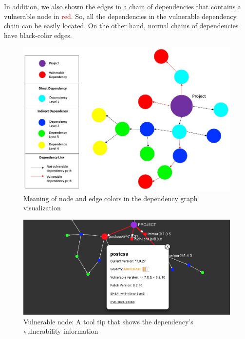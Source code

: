 \documentclass[conference]{IEEEtran}
\begin{document}
	In addition, we also shown the edges in a chain of dependencies that contains a vulnerable node in \textcolor{red}{red}. So, all the dependencies in the vulnerable dependency chain can be easily located. On the other hand, normal chains of dependencies have black-color edges.
	
	\begin{figure}[tb]
		\centering
		\includegraphics[width=\columnwidth]{Figures/Viz-concept-1.jpg}
		\caption{Meaning of node and edge colors in the dependency graph visualization}
		\label{fig:viz-concept}
	\end{figure}
	
	\begin{figure}
		\centering
		\includegraphics[width=\columnwidth]{Figures/tooltip_moderate}
		\caption{Vulnerable node: A tool tip that shows the dependency's vulnerability information}
		\label{fig:tooltip_moderate}
	\end{figure}
	
\end{document}
